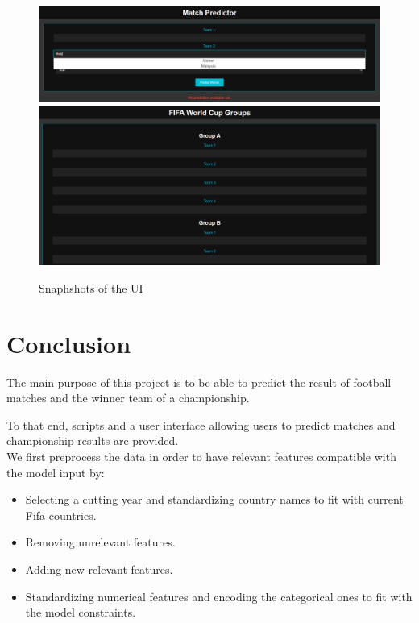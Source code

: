 \documentclass[a4paper,12pt]{article}
\begin{document}
\begin{figure}[H]
  \centering
  \includegraphics[width=1\textwidth]{./images/match_predictor.png}
  \includegraphics[width=1\textwidth]{./images/tournament_predict.png}
  \caption{Snaphshots of the UI}
  \label{fig:ui_match_predictor}
\end{figure}


\section{Conclusion}

The main purpose of this project is to be able to predict the result of football matches and the winner team of a championship.

To that end, scripts and a user interface allowing users to predict matches and championship results are provided.\\

We first preprocess the data in order to have relevant features compatible with the model input by:
\begin{itemize}
    \item Selecting a cutting year and standardizing country names to fit with current Fifa countries.
    \item Removing unrelevant features.
    \item Adding new relevant features.
    \item Standardizing numerical features and encoding the categorical ones to fit with the model constraints.
\end{itemize}
\end{document}
